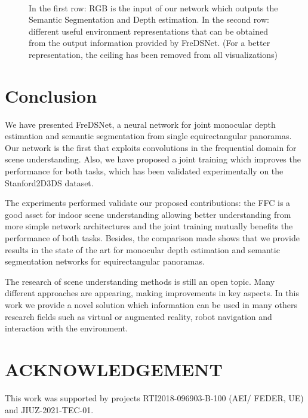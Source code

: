 \documentclass[letterpaper, 10 pt, conference]{ieeeconf}
\begin{document}
\begin{figure*}
\centering
{}\hfil
{} \hfil
{} \\
\hfil
{}\hfil
{}\hfil
{}\hfil
\caption{In the first row: RGB is the input of our network which outputs the Semantic Segmentation and Depth estimation. In the second row: different useful environment representations that can be obtained from the output information provided by FreDSNet. (For a better representation, the ceiling has been removed from all visualizations)}
\label{fig:navigation}
\end{figure*}

\section{Conclusion}
\label{sec:conclusion}

We have presented FreDSNet, a neural network for joint monocular depth estimation and semantic segmentation from single equirectangular panoramas. Our network is the first that exploits convolutions in the frequential domain for scene understanding. 
Also, we have proposed a joint training which improves the performance for both tasks, which has been validated experimentally on the Stanford2D3DS dataset. 

The experiments performed validate our proposed contributions: the FFC is a good asset for indoor scene understanding allowing better understanding from more simple network architectures and the joint training mutually benefits the performance of both tasks. 
Besides, the comparison made shows that we provide results in the state of the art for monocular depth estimation and semantic segmentation networks for equirectangular panoramas.

The research of scene understanding methods is still an open topic. Many different approaches are appearing, making improvements in key aspects. In this work we provide a novel solution which information can be used in many others research fields such as virtual or augmented reality, robot navigation and interaction with the environment.


\section*{ACKNOWLEDGEMENT}
This work was supported by projects RTI2018-096903-B-100 (AEI/ FEDER, UE) and JIUZ-2021-TEC-01.






\end{document}
